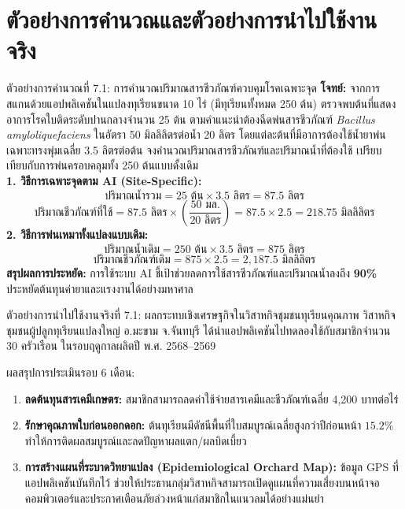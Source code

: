 \section{ตัวอย่างการคำนวณและตัวอย่างการนำไปใช้งานจริง}

\begin{examplebox}{ตัวอย่างการคำนวณที่ 7.1: การคำนวณปริมาณสารชีวภัณฑ์ควบคุมโรคเฉพาะจุด}
\textbf{โจทย์:} จากการสแกนด้วยแอปพลิเคชันในแปลงทุเรียนขนาด 10 ไร่ (มีทุเรียนทั้งหมด 250 ต้น) ตรวจพบต้นที่แสดงอาการโรคใบติดระดับปานกลางจำนวน 25 ต้น ตามคำแนะนำต้องฉีดพ่นสารชีวภัณฑ์ \textit{Bacillus amyloliquefaciens} ในอัตรา 50 มิลลิลิตรต่อน้ำ 20 ลิตร โดยแต่ละต้นที่มีอาการต้องใช้น้ำยาพ่นเฉพาะทรงพุ่มเฉลี่ย 3.5 ลิตรต่อต้น จงคำนวณปริมาณสารชีวภัณฑ์และปริมาณน้ำที่ต้องใช้ เปรียบเทียบกับการพ่นครอบคลุมทั้ง 250 ต้นแบบดั้งเดิม\\[4pt]
\textbf{1. วิธีการเฉพาะจุดตาม AI (Site-Specific):}
\[
\text{ปริมาณน้ำรวม} = 25 \text{ ต้น} \times 3.5 \text{ ลิตร} = 87.5 \text{ ลิตร}
\]
\[
\text{ปริมาณชีวภัณฑ์ที่ใช้} = 87.5 \text{ ลิตร} \times \left( \frac{50 \text{ มล.}}{20 \text{ ลิตร}} \right) = 87.5 \times 2.5 = 218.75 \text{ มิลลิลิตร}
\]
\textbf{2. วิธีการพ่นเหมาทั้งแปลงแบบเดิม:}
\[
\text{ปริมาณน้ำเดิม} = 250 \text{ ต้น} \times 3.5 \text{ ลิตร} = 875 \text{ ลิตร}
\]
\[
\text{ปริมาณชีวภัณฑ์เดิม} = 875 \times 2.5 = 2,187.5 \text{ มิลลิลิตร}
\]
\textbf{สรุปผลการประหยัด:} การใช้ระบบ AI ชี้เป้าช่วยลดการใช้สารชีวภัณฑ์และปริมาณน้ำลงถึง \textbf{90\%} ประหยัดต้นทุนค่ายาและแรงงานได้อย่างมหาศาล
\end{examplebox}

\begin{casestudybox}{ตัวอย่างการนำไปใช้งานจริงที่ 7.1: ผลกระทบเชิงเศรษฐกิจในวิสาหกิจชุมชนทุเรียนคุณภาพ}
วิสาหกิจชุมชนผู้ปลูกทุเรียนแปลงใหญ่ อ.มะขาม จ.จันทบุรี ได้นำแอปพลิเคชันไปทดลองใช้กับสมาชิกจำนวน 30 ครัวเรือน ในรอบฤดูกาลผลิตปี พ.ศ. 2568--2569

ผลสรุปการประเมินรอบ 6 เดือน:
\begin{enumerate}[leftmargin=1.4em, itemsep=2pt]
    \item \textbf{ลดต้นทุนสารเคมีเกษตร:} สมาชิกสามารถลดค่าใช้จ่ายสารเคมีและชีวภัณฑ์เฉลี่ย 4,200 บาทต่อไร่
    \item \textbf{รักษาคุณภาพใบก่อนออกดอก:} ต้นทุเรียนมีดัชนีพื้นที่ใบสมบูรณ์เฉลี่ยสูงกว่าปีก่อนหน้า $15.2\%$ ทำให้การติดผลสมบูรณ์และลดปัญหาผลแตก/ผลบิดเบี้ยว
    \item \textbf{การสร้างแผนที่ระบาดวิทยาแปลง (Epidemiological Orchard Map):} ข้อมูล GPS ที่แอปพลิเคชันบันทึกไว้ ช่วยให้ประธานกลุ่มวิสาหกิจสามารถเปิดดูแผนที่ความเสี่ยงบนหน้าจอคอมพิวเตอร์และประกาศเตือนภัยล่วงหน้าแก่สมาชิกในแนวลมได้อย่างแม่นยำ
\end{enumerate}
\end{casestudybox}

